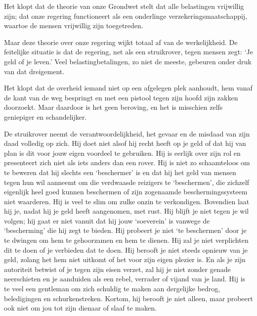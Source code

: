 \documentclass[
  a5paper,
  smalldemyvopaper,10pt,twoside,onecolumn,openright,extrafontsizes,hidelinks]{memoir}
\renewenvironment{quote}%
               {\list{}{\rightmargin=.6cm\leftmargin=.6cm}%
                \itshape \item[]}%
               {\endlist}
\begin{document}
\begin{quote}
Het klopt dat de theorie van onze Grondwet stelt dat alle belastingen
vrijwillig zijn; dat onze regering functioneert als een onderlinge
verzekeringsmaatschappij, waartoe de mensen vrijwillig zijn toegetreden.

Maar deze theorie over onze regering wijkt totaal af van de
werkelijkheid. De feitelijke situatie is dat de regering, net als een
struikrover, tegen mensen zegt: `Je geld of je leven.' Veel
belastingbetalingen, zo niet de meeste, gebeuren onder druk van dat
dreigement.

Het klopt dat de overheid iemand niet op een afgelegen plek aanhoudt,
hem vanaf de kant van de weg bespringt en met een pistool tegen zijn
hoofd zijn zakken doorzoekt. Maar daardoor is het geen beroving, en het
is misschien zelfs geniepiger en schandelijker.

De struikrover neemt de verantwoordelijkheid, het gevaar en de misdaad
van zijn daad volledig op zich. Hij doet niet alsof hij recht heeft op
je geld of dat hij van plan is dit voor jouw eigen voordeel te
gebruiken. Hij is eerlijk over zijn rol en presenteert zich niet als
iets anders dan een rover. Hij is niet zo schaamteloos om te beweren dat
hij slechts een `beschermer' is en dat hij het geld van mensen tegen hun
wil aanneemt om die verdwaasde reizigers te `beschermen', die zichzelf
eigenlijk heel goed kunnen beschermen of zijn zogenaamde
beschermingssysteem niet waarderen. Hij is veel te slim om zulke onzin
te verkondigen. Bovendien laat hij je, nadat hij je geld heeft
aangenomen, met rust. Hij blijft je niet tegen je wil volgen; hij gaat
er niet vanuit dat hij jouw `soeverein' is vanwege de `bescherming' die
hij zegt te bieden. Hij probeert je niet `te beschermen' door je te
dwingen om hem te gehoorzamen en hem te dienen. Hij zal je niet
verplichten dit te doen of je verbieden dat te doen. Hij berooft je niet
steeds opnieuw van je geld, zolang het hem niet uitkomt of het voor zijn
eigen plezier is. En als je zijn autoriteit betwist of je tegen zijn
eisen verzet, zal hij je niet zonder genade neerschieten en je aanduiden
als een rebel, verrader of vijand van je land. Hij is te veel een
gentleman om zich schuldig te maken aan dergelijke bedrog, beledigingen
en schurkenstreken. Kortom, hij berooft je niet alleen, maar probeert
ook niet om jou tot zijn dienaar of slaaf te maken.
\end{quote}
\end{document}
